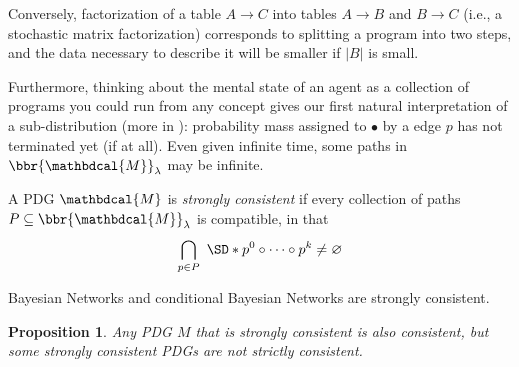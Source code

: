 \documentclass[letterpaper]{article} %
\theoremstyle{plain}
\newtheorem{prop}[theorem]{Proposition}
\theoremstyle{definition}
\theoremstyle{remark}
\newcommand{\none}{\bullet}
\newcommand{\dg}[1]{\mathbdcal{#1}}
\begin{document}
{\begin{example}
		Conversely, factorization of a table $A \to C$ into tables $A \to B$ and $B \to C$ (i.e., a stochastic matrix factorization) corresponds to splitting a program into two steps, and the data necessary to describe it will be smaller if $|B|$ is small.
	\end{example}	
	
	
	Furthermore, thinking about the mental state of an agent as a collection of programs you could run from any concept gives our first natural interpretation of a sub-distribution (more in ): probability mass assigned to $\none$ by a edge $p$ has not terminated yet (if at all). 
	Even given infinite time, some paths in $\bbr{\dg M}_\lambda$ may be infinite.
	
	\begin{defn}
		A PDG $\dg M$ is \emph{strongly consistent} if every collection of paths $P \subseteq \bbr{\dg M}_\lambda$ is compatible, in that 
		$$\bigcap_{p \in P}\ \SD*{\vphantom{\Big|}p^0\circ \cdots\circ p^k} \neq \varnothing$$
	\end{defn}

	\begin{example}
		Bayesian Networks and conditional Bayesian Networks are strongly consistent.
	\end{example}

	\begin{prop}
		Any PDG $M$ that is strongly consistent is also consistent, but some strongly consistent PDGs are not strictly consistent.
	\end{prop}
}
\end{document}
